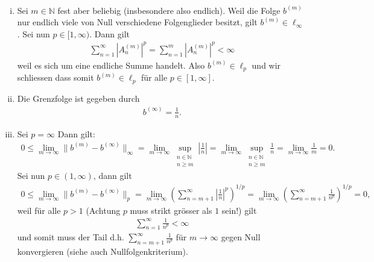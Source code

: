 \documentclass[a4paper, 20]{exam}
\begin{document}
\begin{solution} \
\begin{enumerate}[i)]
\item Sei $m \in \mathbb{N}$ fest aber beliebig (insbesondere also endlich). Weil die Folge $b^{(m)}$ nur endlich viele von Null verschiedene Folgenglieder besitzt, gilt $b^{(m)} \in \ell_\infty$. Sei nun $p \in [1, \infty)$. Dann gilt
\begin{align*}
\sum_{n=1}^\infty |A_n^{(m)}|^p = \sum_{n=1}^m |A_n^{(m)}|^p < \infty
\end{align*}
weil es sich um eine endliche Summe handelt. Also $b^{(m)} \in \ell_p$ und wir schliessen dass somit $b^{(m)} \in \ell_p$ für alle $p \in [1, \infty]$. 
\item Die Grenzfolge ist gegeben durch 
\begin{align*}
b^{( \infty)} = \frac{1}{n}.
\end{align*}
\item Sei $p = \infty$ Dann gilt:
\begin{align*}
0 \leq \lim_{m \to \infty} \|b^{(m)} - b^{(\infty)}\|_\infty = \lim_{m \to \infty} \sup_{\substack{n \in \mathbb{N} \\ n \geq m}} \left| \frac{1}{n}\right| = \lim_{m \to \infty} \sup_{\substack{n \in \mathbb{N} \\ n \geq m}}  \frac{1}{n} = \lim_{m \to \infty} \frac{1}{m} = 0. 
\end{align*}
Sei nun $p \in (1, \infty)$, dann gilt 
\begin{align*}
0 \leq \lim_{m \to \infty} \|b^{(m)}- b^{( \infty)} \|_p = \lim_{m \to \infty} \left( \sum_{n=m+1}^\infty \left| \frac{1}{n}\right|^p \right)^{1/p} =\lim_{m \to \infty} \left( \sum_{n=m+1}^\infty  \frac{1}{n^p} \right)^{1/p}= 0,
\end{align*}
weil für alle $p > 1$ (Achtung $p$ muss strikt grösser als $1$ sein!) gilt
\begin{align*}
\sum_{n=1}^\infty \frac{1}{n^p}< \infty
\end{align*}
und somit muss der Tail d.h. $\sum_{n=m+1}^\infty \frac{1}{n^p}$ für $m \to \infty$  gegen Null konvergieren (siehe auch Nullfolgenkriterium). 
\end{enumerate}
\end{solution}
\end{document}
